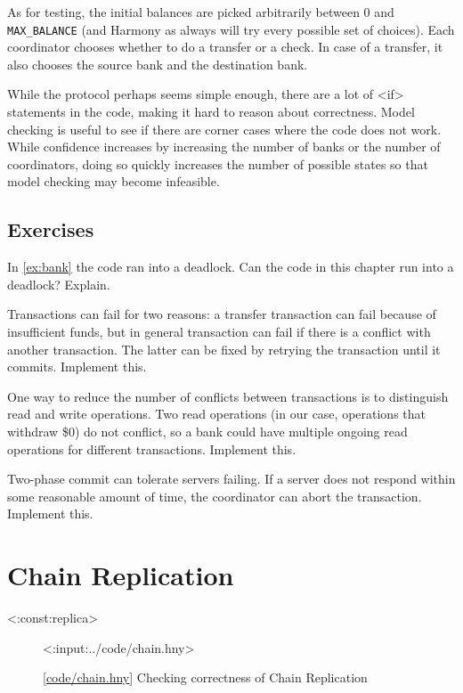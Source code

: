 \documentclass{report}
\newcommand{\harmonylink}[1]{%
[\href{https://harmony.cs.cornell.edu/#1}{\underline{#1}}]%
}
\newenvironment{code}{
\tcolorbox
}{
\endtcolorbox
}
\begin{document}
As for testing, the initial balances are picked arbitrarily between
0 and \texttt{MAX\_BALANCE} (and Harmony as always will try every
possible set of choices).
Each coordinator chooses whether to do a transfer or a check.  In
case of a transfer, it also chooses the source bank and the destination
bank.

While the protocol perhaps seems simple enough, there are a lot of
<{if}> statements in the code, making it hard to reason about
correctness.
Model checking is useful to see if there are corner
cases where the code does not work.
While confidence increases by
increasing the number of banks or the number of coordinators, doing so
quickly increases the number of possible states so that model checking
may become infeasible.

\section*{Exercises}
\begin{problems}
\item In \autoref{ex:bank} the code ran into a deadlock.  Can the code
in this chapter run into a deadlock?  Explain.
\item Transactions can fail for two reasons: a transfer transaction can
fail because of insufficient funds, but in general transaction can fail
if there is a conflict with another transaction.  The latter can be
fixed by retrying the transaction until it commits.  Implement this.
\item One way to reduce the number of conflicts between transactions
is to distinguish read and write operations.  Two read operations
(in our case, operations that withdraw \$0) do not conflict,
so a bank could have multiple ongoing read operations
for different transactions.  Implement this.
\item Two-phase commit can tolerate servers failing.  If a server does not
respond within some reasonable amount of time, the coordinator can abort
the transaction.  Implement this.
\end{problems}

\chapter{Chain Replication}
\label{ch:chain}

<{:const:replica}>

\begin{figure}
\begin{code}
<{:input:../code/chain.hny}>
\end{code}
\caption{\harmonylink{code/chain.hny} Checking correctness of Chain Replication}
\label{fig:chain}
\end{figure}
\end{document}
